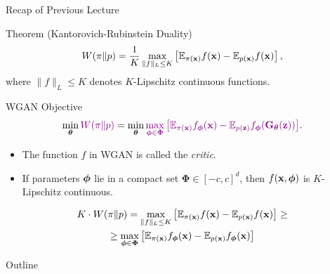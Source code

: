 \documentclass{beamer}
\begin{document}
\begin{frame}{Recap of Previous Lecture}
	\begin{block}{Theorem (Kantorovich-Rubinstein Duality)}
		\vspace{-0.2cm}
		\[
		W(\pi \| p) = \frac{1}{K} \max_{\| f \|_L \leq K} \left[ \mathbb{E}_{\pi(\mathbf{x})} f(\mathbf{x})  - \mathbb{E}_{p(\mathbf{x})} f(\mathbf{x})\right],
		\]
		where $\| f \|_L \leq K$ denotes $K$-Lipschitz continuous functions.
	\end{block}
	\begin{block}{WGAN Objective}
		\vspace{-0.3cm}
		\[
		\min_{\boldsymbol{\theta}} {\color{violet}W(\pi \| p)} = \min_{\boldsymbol{\theta}} {\color{violet}\max_{\boldsymbol{\phi} \in \boldsymbol{\Phi}} \left[ \mathbb{E}_{\pi(\mathbf{x})} f_{\boldsymbol{\phi}}(\mathbf{x})  - \mathbb{E}_{p(\mathbf{z})} f_{\boldsymbol{\phi}}(\mathbf{G}_{\boldsymbol{\theta}}(\mathbf{z}))\right]}.
		\]
		\vspace{-0.3cm}
	\end{block}
	\begin{itemize}
		\item The function $f$ in WGAN is called the \textit{critic}.
		\item If parameters $\boldsymbol{\phi}$ lie in a compact set $\boldsymbol{\Phi} \in [-c, c]^d$, then $f(\mathbf{x}, \boldsymbol{\phi})$ is $K$-Lipschitz continuous. 
	\end{itemize}
	\begin{multline*}
		K \cdot W(\pi \| p) = \max_{\| f \|_L \leq K} \left[ \mathbb{E}_{\pi(\mathbf{x})} f(\mathbf{x}) - \mathbb{E}_{p(\mathbf{x})} f(\mathbf{x})\right] \geq \\ \geq \max_{\boldsymbol{\phi} \in \boldsymbol{\Phi}} \left[ \mathbb{E}_{\pi(\mathbf{x})} f_{\boldsymbol{\phi}}(\mathbf{x})  - \mathbb{E}_{p(\mathbf{x})} f_{\boldsymbol{\phi}}(\mathbf{x})\right]
	\end{multline*}
\end{frame}
\begin{frame}{Outline}
	\tableofcontents
\end{frame}
\end{document}
